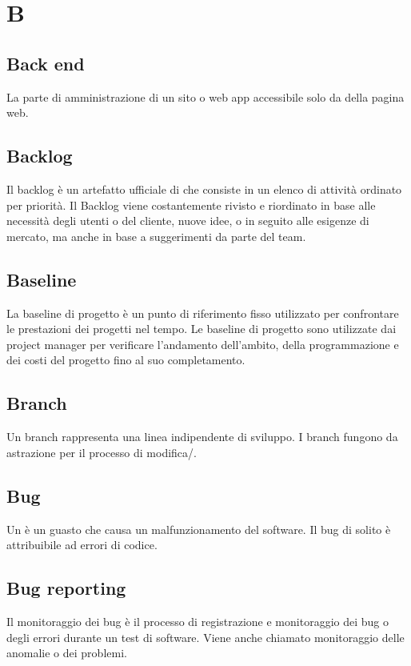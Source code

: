\chapter{B}
\section{Back end}\label{sec:Back-end}
La parte di amministrazione di un sito o web app accessibile solo da  della pagina web.

\section{Backlog}
Il backlog è un artefatto ufficiale di  che consiste in un elenco di attività ordinato per priorità. Il Backlog viene costantemente rivisto e riordinato in base alle necessità degli utenti o del cliente, nuove idee, o in seguito alle esigenze di mercato, ma anche in base a suggerimenti da parte del team.

\section{Baseline}
La baseline di progetto è un punto di riferimento fisso utilizzato per confrontare le prestazioni dei progetti nel tempo. Le baseline di progetto sono utilizzate dai project manager per verificare l'andamento dell'ambito, della programmazione e dei costi del progetto fino al suo completamento.

\section{Branch}
Un branch rappresenta una linea indipendente di sviluppo. I branch fungono da astrazione per il processo di modifica/.

\section{Bug}\label{sec:Bugs}
Un  è un guasto che causa un malfunzionamento del software. Il bug di solito è attribuibile ad errori di codice.

\section{Bug reporting}
Il monitoraggio dei bug è il processo di registrazione e monitoraggio dei bug o degli errori durante un test di software. Viene anche chiamato monitoraggio delle anomalie o dei problemi.

